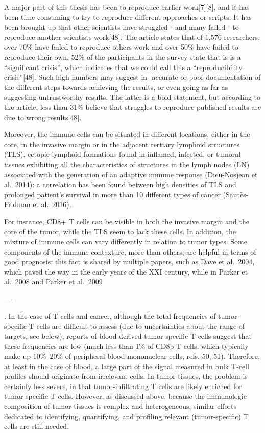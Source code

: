 \documentclass[12pt,]{book}
\theoremstyle{definition}
\theoremstyle{definition}
\theoremstyle{definition}
\theoremstyle{remark}
\begin{document}
A major part of this thesis has been to reproduce earlier
work{[}7{]}{[}8{]}, and it has been time consuming to try to reproduce
different approaches or scripts. It has been brought up that other
scientists have struggled - and many failed - to reproduce another
scientists work{[}48{]}. The article states that of 1,576 researchers,
over 70\% have failed to reproduce others work and over 50\% have failed
to reproduce their own. 52\% of the participants in the survey state
that is is a ``significant crisis'', which indicates that we could call
this a ``reproducibility crisis''{[}48{]}. Such high numbers may suggest
in- accurate or poor documentation of the different steps towards
achieving the results, or even going as far as suggesting untrustworthy
results. The latter is a bold statement, but according to the article,
less than 31\% believe that struggles to reproduce published results are
due to wrong results{[}48{]}.

Moreover, the immune cells can be situated in different locations,
either in the core, in the invasive margin or in the adjacent tertiary
lymphoid structures (TLS), ectopic lymphoid formations found in
inflamed, infected, or tumoral tissues exhibiting all the
characteristics of structures in the lymph nodes (LN) associated with
the generation of an adaptive immune response (Dieu-Nosjean et
al.~2014): a correlation has been found between high densities of TLS
and prolonged patient's survival in more than 10 different types of
cancer (Sautès-Fridman et al.~2016).

For instance, CD8+ T cells can be visible in both the invasive margin
and the core of the tumor, while the TLS seem to lack these cells. In
addition, the mixture of immune cells can vary differently in relation
to tumor types. Some components of the immune contexture, more than
others, are helpful in terms of good prognosis: this fact is shared by
multiple papers, such as Dave et al.~2004, which paved the way in the
early years of the XXI century, while in Parker et al.~2008 and Parker
et al.~2009

----

. In the case of T cells and cancer, although the total frequencies of
tumor-specific T cells are difficult to assess (due to uncertainties
about the range of targets, see below), reports of blood-derived
tumor-specific T cells suggest that these frequencies are low (much less
than 1\% of CD8þ T cells, which typically make up 10\%--20\% of
peripheral blood mononuclear cells; refs. 50, 51). Therefore, at least
in the case of blood, a large part of the signal measured in bulk T-cell
profiles should originate from irrelevant cells. In tumor tissues, the
problem is certainly less severe, in that tumor-infiltrating T cells are
likely enriched for tumor-specific T cells. However, as discussed above,
because the immunologic composition of tumor tissues is complex and
heterogeneous, similar efforts dedicated to identifying, quantifying,
and profiling relevant (tumor-specific) T cells are still needed.
\end{document}
